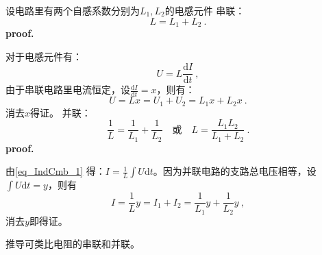 
\begin{issues}
\issueDraft
\end{issues}

设电路里有两个自感系数分别为$L_1,L_2$的电感元件
串联：
\begin{equation}
L = L_1 + L_2~.
\end{equation}
\textbf{proof.}

对于电感元件有：
\begin{equation}\label{eq_IndCmb_1}
U=L\frac{\mathrm d I}{\mathrm d t}~,
\end{equation}
由于串联电路里电流恒定，设$\frac{\mathrm d I}{\mathrm d t}=x$，则有：
\begin{equation}
U=Lx=U_1+U_2=L_1x+L_2x~.
\end{equation}
消去$x$得证。
并联：
\begin{equation}
\frac{1}{L} = \frac{1}{L_1} + \frac{1}{L_2}
\quad \text{或} \quad
L = \frac{L_1L_2}{L_1 + L_2}~.
\end{equation}
\textbf{proof.}

由\autoref{eq_IndCmb_1} 得：$I=\frac{1}{L}\int U\mathrm dt$。因为并联电路的支路总电压相等，设$\int U\mathrm dt=y$，则有
\begin{equation}
I=\frac{1}{L}y=I_1+I_2=\frac{1}{L_1}y+\frac{1}{L_2}y~,
\end{equation}
消去$y$即得证。

推导可类比电阻的串联和并联。
